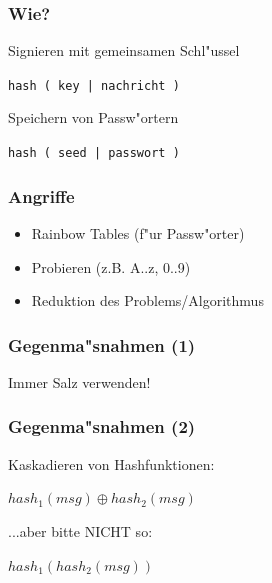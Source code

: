 

\begin{frame}
\frametitle{Wie?}
	Signieren mit gemeinsamen Schl"ussel
	\par
	\begin{center}\large{\texttt{hash ( key | nachricht )}}\end{center}
	\vspace{5mm}
	Speichern von Passw"ortern
	\par
	\begin{center}\large{\texttt{hash ( seed | passwort )}}\end{center}
\end{frame}

\begin{frame}
\frametitle{Angriffe}
	\begin{itemize}
		\item Rainbow Tables (f"ur Passw"orter)
		\item Probieren (z.B. A..z, 0..9)
		\item Reduktion des Problems/Algorithmus
	\end{itemize}
\end{frame}

\begin{frame}
\frametitle{Gegenma"snahmen (1)}
	\large{Immer Salz verwenden!}
\end{frame}

\begin{frame}
\frametitle{Gegenma"snahmen (2)}
	Kaskadieren von Hashfunktionen:
	\par
	\begin{center}\large{\texttt{$hash_1 (msg) \oplus hash_2(msg)$}}\end{center}
	\vspace{5mm}
	\par
	...aber bitte \large{NICHT} so:
	\par
	\begin{center}\large{\texttt{$hash_1 (hash_2(msg))$}}\end{center}
\end{frame}


